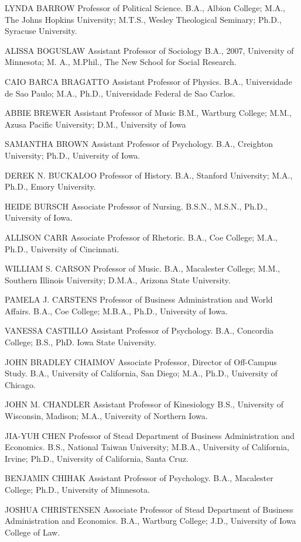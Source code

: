 \documentclass[
  letterpaper,
]{scrbook}
\begin{document}
LYNDA BARROW Professor of Political Science. B.A., Albion College; M.A.,
The Johns Hopkins University; M.T.S., Wesley Theological Seminary;
Ph.D., Syracuse University.

ALISSA BOGUSLAW Assistant Professor of Sociology B.A., 2007, University
of Minnesota; M. A., M.Phil., The New School for Social Research.

CAIO BARCA BRAGATTO Assistant Professor of Physics. B.A., Universidade
de Sao Paulo; M.A., Ph.D., Universidade Federal de Sao Carlos.

ABBIE BREWER Assistant Professor of Music B.M., Wartburg College; M.M.,
Azusa Pacific University; D.M., University of Iowa

SAMANTHA BROWN Assistant Professor of Psychology. B.A., Creighton
University; Ph.D., University of Iowa.

DEREK N. BUCKALOO Professor of History. B.A., Stanford University; M.A.,
Ph.D., Emory University.

HEIDE BURSCH Associate Professor of Nursing. B.S.N., M.S.N., Ph.D.,
University of Iowa.

ALLISON CARR Associate Professor of Rhetoric. B.A., Coe College; M.A.,
Ph.D., University of Cincinnati.

WILLIAM S. CARSON Professor of Music. B.A., Macalester College; M.M.,
Southern Illinois University; D.M.A., Arizona State University.

PAMELA J. CARSTENS Professor of Business Administration and World
Affairs. B.A., Coe College; M.B.A., Ph.D., University of Iowa.

VANESSA CASTILLO Assistant Professor of Psychology. B.A., Concordia
College; B.S., PhD. Iowa State University.

JOHN BRADLEY CHAIMOV Associate Professor, Director of Off-Campus Study.
B.A., University of California, San Diego; M.A., Ph.D., University of
Chicago.

JOHN M. CHANDLER Assistant Professor of Kinesiology B.S., University of
Wisconsin, Madison; M.A., University of Northern Iowa.

JIA-YUH CHEN Professor of Stead Department of Business Administration
and Economics. B.S., National Taiwan University; M.B.A., University of
California, Irvine; Ph.D., University of California, Santa Cruz.

BENJAMIN CHIHAK Assistant Professor of Psychology. B.A., Macalester
College; Ph.D., University of Minnesota.

JOSHUA CHRISTENSEN Associate Professor of Stead Department of Business
Administration and Economics. B.A., Wartburg College; J.D., University
of Iowa College of Law.
\end{document}
